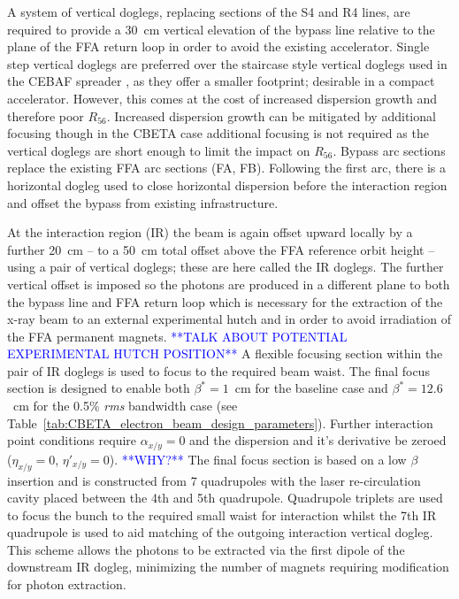 \documentclass[../main.tex]{subfiles}
\begin{document}
A system of vertical doglegs, replacing sections of the S4 and R4 lines, are required to provide a 30~\si{\centi\meter} vertical elevation of the bypass line relative to the plane of the FFA return loop in order to avoid the existing accelerator. Single step vertical doglegs are preferred over the staircase style vertical doglegs used in the CEBAF spreader \cite{york1987optics}, as they offer a smaller footprint; desirable in a compact accelerator. However, this comes at the cost of increased dispersion growth and therefore poor $R_{56}$. Increased dispersion growth can be mitigated by additional focusing though in the CBETA case additional focusing is not required as the vertical doglegs are short enough to limit the impact on $R_{56}$.   
Bypass arc sections replace the existing FFA arc sections (FA, FB). Following the first arc, there is a horizontal dogleg used to close horizontal dispersion before the interaction region and offset the bypass from existing infrastructure. 

At the interaction region (IR) the beam is again offset upward locally by a further 20~\si{\centi\meter} -- to a 50~\si{\centi\meter} total offset above the FFA reference orbit height -- using a pair of vertical doglegs; these are here called the IR doglegs. The further vertical offset is imposed so the photons are produced in a different plane to both the bypass line and FFA return loop which is necessary for the extraction of the x-ray beam to an external experimental hutch and in order to avoid irradiation of the FFA permanent magnets. \textcolor{blue}{**TALK ABOUT POTENTIAL EXPERIMENTAL HUTCH POSITION**} A flexible focusing section within the pair of IR doglegs is used to focus to the required beam waist. The final focus section is designed to enable both $\beta^{*} = 1$~\si{\centi\meter} for the baseline case and $\beta^{*} = 12.6$~\si{\centi\meter} for the 0.5\% \textit{rms} bandwidth case (see Table~\ref{tab:CBETA_electron_beam_design_parameters}). Further interaction point conditions require $\alpha_{x/y} =0$ and the dispersion and it's derivative be zeroed ($\eta_{x/y} = 0$, $\eta'_{x/y} = 0$). \textcolor{blue}{**WHY?**} The final focus section is based on a low $\beta$ insertion \cite{chao2013handbook} and is constructed from 7 quadrupoles with the laser re-circulation cavity placed between the 4th and 5th quadrupole. Quadrupole triplets are used to focus the bunch to the required small waist for interaction whilst the 7th IR quadrupole is used to aid matching of the outgoing interaction vertical dogleg. This scheme allows the photons to be extracted via the first dipole of the downstream IR dogleg, minimizing the number of magnets requiring modification for photon extraction. 
\end{document}
